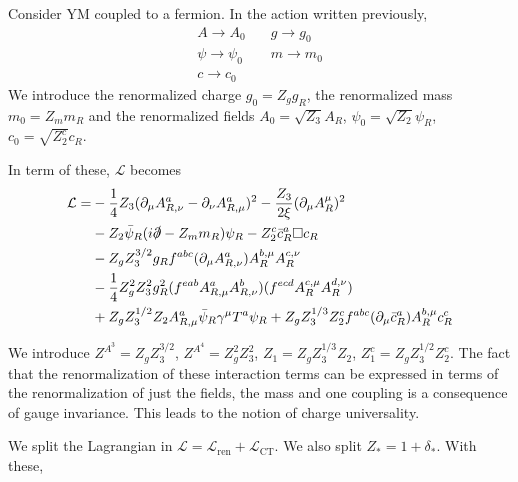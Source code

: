 \documentclass[a4paper]{book}
\theoremstyle{definition}
\theoremstyle{remark}
\begin{document}
Consider YM coupled to a fermion. In the action written previously, 
\begin{equation}
    \begin{aligned}
        A\rightarrow A_0 &\quad g \rightarrow g_0 \\ 
        \psi \rightarrow\psi_0 &\quad m \rightarrow m_0 \\ 
        c \rightarrow c_0 &
    \end{aligned}
\end{equation}
We introduce the renormalized charge $g_0 = Z_g g_R$, the renormalized mass $m_0 = Z_m m_R$ and the renormalized fields $A_0 = \sqrt{Z_3}A_R$, $\psi_0 = \sqrt{Z_2}\psi_R$, $c_0 = \sqrt{Z_2^c}c_R$. \par \medskip 

In term of these, $\mathcal L$ becomes 
\begin{equation}
    \begin{aligned}
        \mathcal L =& -\frac{1}{4}Z_3 (\partial_\mu A^a_{R,\nu} - \partial_\nu A^a_{R, \mu})^2 - \frac{Z_3}{2\xi}(\partial_\mu A^\mu_R)^2 \\ 
        &- Z_2 \bar \psi_R (i\slashed{\partial} - Z_m m_R)\psi_R - Z_2^c \bar{c}_R^a \square c_R \\ 
        &- Z_g Z_3^{3/2}g_R f^{abc}(\partial_\mu A^a_{R,\nu}) A^{b,\mu}_R A^{c,\nu}_R \\ 
        &-\frac{1}{4}Z^2_g Z^2_3 g^2_R (f^{eab}A^a_{R,\mu} A^b_{R,\nu})(f^{ecd} A^{c,\mu}_R A^{d,\nu}_R) \\ 
        &+ Z_g Z^{1/2}_3 Z_2 A^a_{R,\mu} \bar \psi_R \gamma^\mu T^a \psi_R + Z_g Z^{1/3}_3 Z^c_2 f^{abc}(\partial_\mu \bar c^a_R) A^{b,\mu}_R c^c_R
    \end{aligned}
\end{equation}

We introduce $Z^{A^3} = Z_g Z_3^{3/2}$, $Z^{A^4} = Z_g^2 Z_3^2$, $Z_1 = Z_gZ_3^{1/3}Z_2$, $Z^c_1 = Z_gZ_3^{1/2}Z^c_2$. The fact that the renormalization of these interaction terms can be expressed in terms of the renormalization of just the fields, the mass and one coupling is a consequence of gauge invariance. This leads to the notion of charge universality. \par \medskip 

We split the Lagrangian in $\mathcal L = \mathcal L_{\text{ren}} + \mathcal L_{\text{CT}}$. We also split $Z_* = 1 + \delta_*$. With these, 
\end{document}
